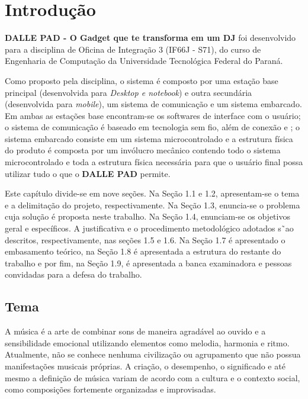 
\chapter{Introdução}
\label{chap:introducao}

    \textbf{DALLE PAD - O Gadget que te transforma em um DJ} foi desenvolvido para a disciplina de Oficina de Integração 3 (IF66J - S71), do curso de Engenharia de Computação da Universidade Tecnológica Federal do Paraná.

    Como proposto pela disciplina, o sistema é composto por uma estação base principal (desenvolvida para \textit{Desktop e notebook}) e outra secundária (desenvolvida para \textit{mobile}), um sistema de comunicação e um sistema embarcado. Em ambas as estações base encontram-se os softwares de interface com o usuário; o sistema de comunicação é baseado em tecnologia sem fio, além de conexão  e ; o sistema embarcado consiste em um sistema microcontrolado e a estrutura física do produto é composta por um invólucro mecânico contendo todo o sistema microcontrolado e toda a estrutura física necessária para que o usuário final possa utilizar tudo o que o \textbf{DALLE PAD} permite.

    Este capítulo divide-se em nove seções. Na Seção 1.1 e 1.2, apresentam-se o tema e a delimitação do projeto, respectivamente. Na Seção 1.3, enuncia-se o problema cuja solução é proposta neste trabalho. Na Seção 1.4, enunciam-se os objetivos geral e específicos. A justificativa e o procedimento metodológico adotados s˜ao descritos, respectivamente, nas seções 1.5 e 1.6. Na Seção 1.7 é apresentado o embasamento teórico, na Seção 1.8 é apresentada a estrutura do restante do trabalho e por fim, na Seção 1.9, é apresentada a banca examinadora e pessoas convidadas para a defesa do trabalho.

    \section{Tema}

        A música é a arte de combinar sons de maneira agradável ao ouvido e a sensibilidade emocional utilizando elementos como melodia, harmonia e ritmo. Atualmente, não se conhece nenhuma civilização ou agrupamento que não possua manifestações musicais próprias. A criação, o desempenho, o significado e até mesmo a definição de música variam de acordo com a cultura e o contexto social, como composições fortemente organizadas e improvisadas.
        
